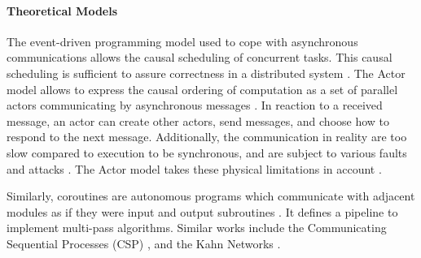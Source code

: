 
\paragraph{Theoretical Models}

The event-driven programming model used to cope with asynchronous communications allows the causal scheduling of concurrent tasks.
This causal scheduling is sufficient to assure correctness in a distributed system \cite{Lamport1978,Reed2012}.
The Actor model allows to express the causal ordering of computation as a set of parallel actors communicating by asynchronous messages \cite{Hewitt1973a, Hewitt1977, Clinger1981}.
In reaction to a received message, an actor can create other actors, send messages, and choose how to respond to the next message.
Additionally, the communication in reality are too slow compared to execution to be synchronous, and are subject to various faults and attacks \cite{Lamport1982}.
The Actor model takes these physical limitations in account \cite{Hewitt1977a}.


Similarly, coroutines are autonomous programs which communicate with adjacent modules as if they were input and output subroutines \cite{Conway1963}.
It defines a pipeline to implement multi-pass algorithms.
Similar works include the Communicating Sequential Processes (CSP) \cite{Hoare1978, Brookes1984}, and the Kahn Networks \cite{Kahn1974, Kahn1976}.

